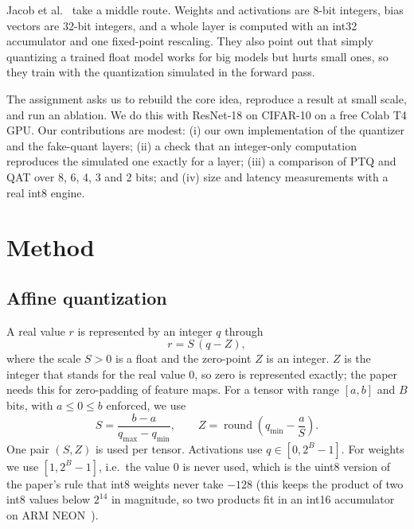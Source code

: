 \documentclass[conference]{IEEEtran}
\begin{document}
Jacob et al.~\cite{jacob2018} take a middle route. Weights and activations are 8-bit integers, bias vectors are 32-bit integers, and a whole layer is computed with an int32 accumulator and one fixed-point rescaling. They also point out that simply quantizing a trained float model works for big models but hurts small ones, so they train with the quantization simulated in the forward pass.

The assignment asks us to rebuild the core idea, reproduce a result at small scale, and run an ablation. We do this with ResNet-18 on CIFAR-10 on a free Colab T4 GPU. Our contributions are modest: (i) our own implementation of the quantizer and the fake-quant layers; (ii) a check that an integer-only computation reproduces the simulated one exactly for a layer; (iii) a comparison of PTQ and QAT over 8, 6, 4, 3 and 2 bits; and (iv) size and latency measurements with a real int8 engine.

\section{Method}
\subsection{Affine quantization}
A real value $r$ is represented by an integer $q$ through
\begin{equation}
r = S\,(q - Z),
\label{eq:affine}
\end{equation}
where the scale $S>0$ is a float and the zero-point $Z$ is an integer. $Z$ is the integer that stands for the real value $0$, so zero is represented exactly; the paper needs this for zero-padding of feature maps. For a tensor with range $[a,b]$ and $B$ bits, with $a\le 0\le b$ enforced, we use
\begin{equation}
S=\frac{b-a}{q_{\max}-q_{\min}},\qquad Z=\operatorname{round}\!\left(q_{\min}-\frac{a}{S}\right).
\end{equation}
One pair $(S,Z)$ is used per tensor. Activations use $q\in[0,2^B-1]$. For weights we use $[1,2^B-1]$, i.e.\ the value $0$ is never used, which is the uint8 version of the paper's rule that int8 weights never take $-128$ (this keeps the product of two int8 values below $2^{14}$ in magnitude, so two products fit in an int16 accumulator on ARM NEON~\cite{jacob2018}).
\end{document}
